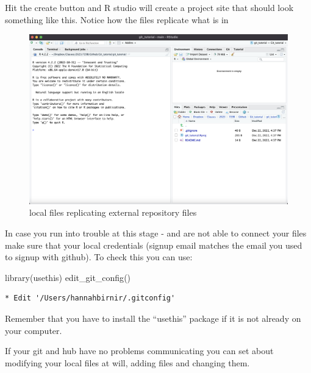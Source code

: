 \documentclass[
  letterpaper,
  DIV=11,
  numbers=noendperiod]{scrartcl}
\newenvironment{Shaded}{\begin{snugshade}}{\end{snugshade}}
\newcommand{\FunctionTok}[1]{\textcolor[rgb]{0.28,0.35,0.67}{#1}}
\newcommand{\NormalTok}[1]{\textcolor[rgb]{0.00,0.23,0.31}{#1}}
\begin{document}
Hit the create button and R studio will create a project site that
should look something like this. Notice how the files replicate what is
in

\begin{figure}

{\centering \includegraphics{figures/9.PNG}

}

\caption{local files replicating external repository files}

\end{figure}

In case you run into trouble at this stage - and are not able to connect
your files make sure that your local credentials (signup email matches
the email you used to signup with github). To check this you can use:

\begin{Shaded}
\begin{Highlighting}[]
\FunctionTok{library}\NormalTok{(usethis)}
\FunctionTok{edit\_git\_config}\NormalTok{()}
\end{Highlighting}
\end{Shaded}

\begin{verbatim}
* Edit '/Users/hannahbirnir/.gitconfig'
\end{verbatim}

Remember that you have to install the ``usethis'' package if it is not
already on your computer.

If your git and hub have no problems communicating you can set about
modifying your local files at will, adding files and changing them.
\end{document}
